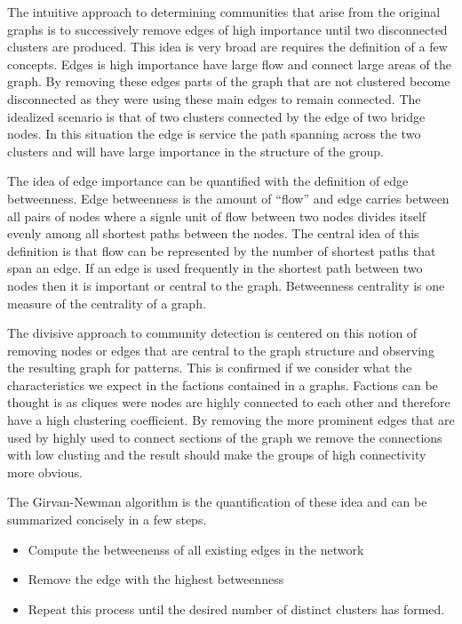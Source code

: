 The intuitive approach to determining communities that arise from the original graphs is to successively remove edges of high importance until two disconnected clusters are produced. This idea is very broad are requires the definition of a few concepts. Edges is high importance have large flow and connect large areas of the graph. By removing these edges parts of the graph that are not clustered become disconnected as they were using these main edges to remain connected. The idealized scenario is that of two clusters connected by the edge of two bridge nodes. In this situation the edge is service the path spanning across the two clusters and will have large importance in the structure of the group. 

The idea of edge importance can be quantified with the definition of edge betweenness. Edge betweenness is the amount of ``flow'' and edge carries between all pairs of nodes where a signle unit of flow between two nodes divides itself evenly among all shortest paths between the nodes. The central idea of this definition is that flow can be represented by the number of shortest paths that span an edge. If an edge is used frequently in the shortest path between two nodes then it is important or central to the graph. Betweenness centrality is one measure of the centrality of a graph. 

The divisive approach to community detection is centered on this notion of removing nodes or edges that are central to the graph structure and observing the resulting graph for patterns. This is confirmed if we consider what the characteristics we expect in the factions contained in a graphs. Factions can be thought is as cliques were nodes are highly connected to each other and therefore have a high clustering coefficient. By removing the more prominent edges that are used by highly used to connect sections of the graph we remove the connections with low clusting and the result should make the groups of high connectivity more obvious. 

The Girvan-Newman algorithm is the quantification of these idea and can be summarized concisely in a few steps. 

\begin{itemize}
\item Compute the betweenenss of all existing edges in the network
\item Remove the edge with the highest betweenness
\item Repeat this process until the desired number of distinct clusters has formed. 
\end{itemize}

